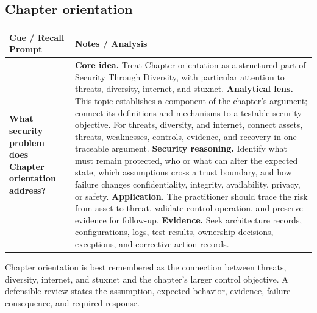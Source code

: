 \documentclass[11pt]{article}
\newcommand{\CornellHeader}{%
\rowcolor{Navy}\color{white}\bfseries Cue / Recall Prompt & \color{white}\bfseries Notes / Analysis\\\hline}
\newcommand{\CornellRow}[2]{%
\cellcolor{CueGray}\RaggedRight\textbf{#1} & \RaggedRight #2\\\hline}
\begin{document}
\subsection*{Chapter orientation}
\begin{longtable}{>{\RaggedRight\arraybackslash}p{}|>{\RaggedRight\arraybackslash}p{}}
\CornellHeader
\CornellRow{What security problem does Chapter orientation address?}{\textbf{Core idea.} Treat Chapter orientation as a structured part of Security Through Diversity, with particular attention to threats, diversity, internet, and stuxnet. \textbf{Analytical lens.} This topic establishes a component of the chapter's argument; connect its definitions and mechanisms to a testable security objective. For threats, diversity, and internet, connect assets, threats, weaknesses, controls, evidence, and recovery in one traceable argument. \textbf{Security reasoning.} Identify what must remain protected, who or what can alter the expected state, which assumptions cross a trust boundary, and how failure changes confidentiality, integrity, availability, privacy, or safety. \textbf{Application.} The practitioner should trace the risk from asset to threat, validate control operation, and preserve evidence for follow-up. \textbf{Evidence.} Seek architecture records, configurations, logs, test results, ownership decisions, exceptions, and corrective-action records.}
\end{longtable}
\begin{topicsummary}
Chapter orientation is best remembered as the connection between threats, diversity, internet, and stuxnet and the chapter's larger control objective. A defensible review states the assumption, expected behavior, evidence, failure consequence, and required response.
\end{topicsummary}
\end{document}
